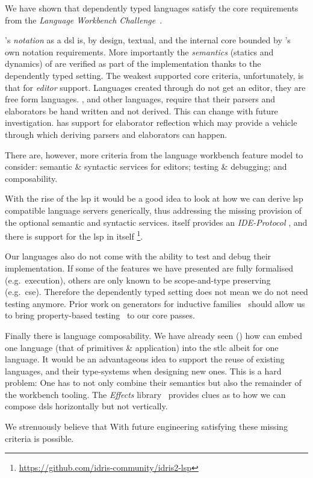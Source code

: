 We have shown that dependently typed languages satisfy the core requirements from the \emph{Language Workbench Challenge}~\cite{DBLP:conf/sle/ErdwegSVBBCGHKLKMPPSSSVVVWW13}.

\Velo{}'s \emph{notation} as a \ac{dsl} is, by design, textual, and the internal core bounded by \Idris{}'s own notation requirements.
%
More importantly the \emph{semantics} (statics and dynamics) of \Velo{}
are verified as part of the implementation thanks to the dependently typed setting.
%
The weakest supported core criteria, unfortunately, is that for \emph{editor} support.
%
Languages created through \Idris{} do not get an editor, they are free form languages.
\Velo{}, and other languages, require that their parsers and elaborators be hand written and not derived.
This can change with future investigation.
\Idris{} has support for elaborator reflection
which may provide a vehicle through which deriving parsers and elaborators can happen.


There are, however, more criteria from the language workbench feature model to consider:
%
semantic \& syntactic services for editors;
%
testing \& debugging;
%
and
%
composability.
%

With the rise of the \ac{lsp} it would be a good idea to look at how we can derive \ac{lsp} compatible language servers generically, thus addressing the missing provision of the optional semantic and syntactic services.
\Idris{} itself provides an \emph{IDE-Protocol}
, and there is support for the \ac{lsp} in \Idris{} itself
\footnote{\url{https://github.com/idris-community/idris2-lsp}}.

Our languages also do not come with the ability to test and debug their
implementation.
%
If some of the features we have presented are fully formalised (e.g.\ execution),
others are only known to be scope-and-type preserving (e.g.\ \ac{cse}).
%
Therefore the dependently typed setting does not mean we do not need testing
anymore.
%
Prior work on generators for inductive families~\cite{DBLP:journals/pacmpl/LampropoulosPP18}
should allow us to bring property-based testing~\cite{DBLP:conf/icfp/ClaessenH00} to our core passes.


Finally there is language composability.
%
We have already seen () how \Velo{} can embed one language (that of primitives \& application) into the \ac{stlc} albeit for one language.
%
It would be an advantageous idea to support the reuse of existing languages, and their type-systems when designing new ones.
%
This is a hard problem:
%
One has to not only combine their semantics but also the remainder of the workbench tooling.
%
The \emph{Effects} library~\cite{DBLP:conf/icfp/Brady13} provides clues as to how we can compose \acp{dsl} horizontally but not vertically.


We strenuously believe that With future engineering satisfying these missing criteria is possible.


